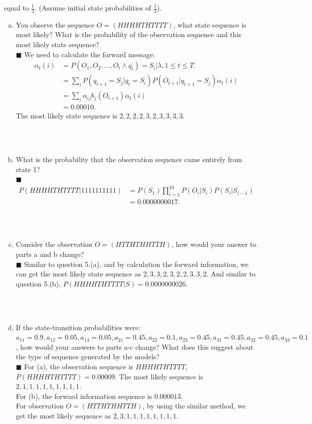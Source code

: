 \documentclass{article}
\newcommand{\solution}[1]{~\\ $\blacksquare$ \sffamily\upshape\selectfont #1
\normalfont ~\\~ }
\begin{document}
equal to $\frac{1}{3}$. (Assume initial state probabilities of $\frac{1}{3}$).
\begin{enumerate}[a.]
\item You observe the sequence $O = (HHHHTHTTTT)$, what state sequence
  is most likely? What is the probability of the observation sequence
  and this most likely state sequence?
\solution{
  We need to calculate the forward message: 
  \begin{align*}
    \alpha_t(i) & = P(O_1,O_2,\ldots,O_t \wedge q_t) = S_i|\lambda, 
    1\leq t \leq T. \\ 
    & = \sum_iP(q_{t+1}=S_j|q_t=S_i)P(O_{t+1}|q_{t+1}=S_j)\alpha_t(i) \\ 
    & = \sum_i\alpha_{ij}b_j(O_{t+1})\alpha_t(i) \\
    & = 0.00010.
  \end{align*}
  The most likely state sequence is $2,2,2,2,3,2,3,3,3,3$. 
}
\item What is the probability that the observation sequence came
  entirely from state 1? 
\solution{
  \begin{align*}
    P(HHHHTHTTTT|1111111111) & = P(S_1)\prod_{i=1}^{10}P(O_i|S_i)P(S_i|S_{i-1}) \\
    & = 0.0000000017. 
  \end{align*}
}
\item Consider the observation $O = (HTTHTHHTTH)$, how would your answer to parts a and b
change? 
\solution{
  Similar to question 5.(a), and by calculation the forward information, we can get the
  most likely state sequence as $2,3,3,2,3,2,2,3,3,2$.
  And similar to question 5.(b), $P(HHHHTHTTTT|S) = 0.0000000026$.
}
\item If the state-transition probabilities were: $a_{11} = 0.9, a_{12} =
  0.05, a_{13} = 0.05, a_{21} = 0.45, a_{22} = 0.1, a_{23} = 0.45,
  a_{31} = 0.45, a_{32} = 0.45, a_{33} = 0.1$, how would your answers
  to parts a-c change? What does this suggest about the type of
  sequence generated by the models? 
\solution{
  For (a), the observation sequence is $HHHHTHTTTT$, $P(HHHHTHTTTT) = 0.00009.$
  The most likely sequence is $2,1,1,1,1,1,1,1,1,1$. \\
  For (b), the forward information sequence is $0.000013$. \\ 
  
  For observation $O=(HTTHTHHTTH)$, by using the similar method, we get the most likely
  sequence as $2,3,1,1,1,1,1,1,1,1$.
}
\end{enumerate}
\end{document}
